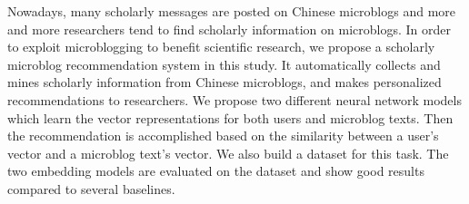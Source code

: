 Nowadays, many scholarly messages are posted on Chinese microblogs and more and more researchers tend to find scholarly information on microblogs. In order to exploit microblogging to benefit scientific research, we propose a scholarly microblog recommendation system in this study. It automatically collects and mines scholarly information from Chinese microblogs, and makes personalized recommendations to researchers. We propose two different neural network models which learn the vector representations for both users and microblog texts. Then the recommendation is accomplished based on the similarity between a user's vector and a microblog text's vector. We also build a dataset for this task. The two embedding models are evaluated on the dataset and show good results compared to several baselines.
